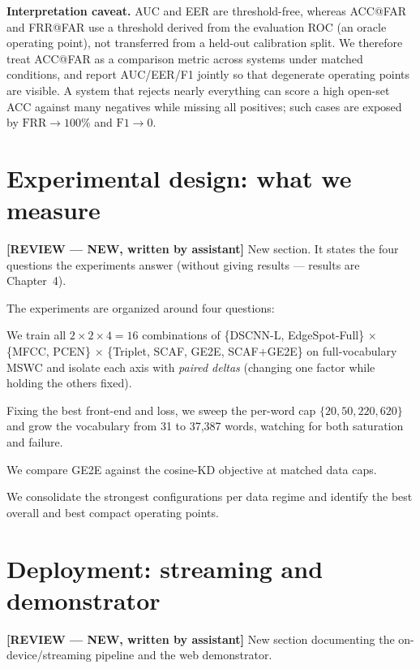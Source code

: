 \documentclass[12pt,a4paper]{report}
\newcommand{\reviewnote}[1]{%
    \par\smallskip\noindent
    \colorbox{yellow!35}{\parbox{0.97\linewidth}{\small\textbf{[REVIEW — NEW, written by assistant]}\; #1}}%
    \par\smallskip}
\newcommand{\reviewnote}[1]{}
\newcommand{\frr}{\text{FRR}}
\begin{document}
\textbf{Interpretation caveat.} AUC and EER are threshold-free, whereas ACC@FAR
and FRR@FAR use a threshold derived from the evaluation ROC (an oracle operating
point), not transferred from a held-out calibration split. We therefore treat
ACC@FAR as a comparison metric across systems under matched conditions, and report
AUC/EER/F1 jointly so that degenerate operating points are visible. A system that
rejects nearly everything can score a high open-set ACC against many negatives
while missing all positives; such cases are exposed by $\frr\to100\%$ and
$\text{F1}\to0$.

\section{Experimental design: what we measure}\label{sec:expdesign}
\reviewnote{New section. It states the four questions the experiments answer
(without giving results --- results are Chapter~4).}

The experiments are organized around four questions:
\begin{description}[leftmargin=1.6em,itemsep=2pt]
\item[\textbf{Q1 --- Which design axis matters?}] We train all
$2{\times}2{\times}4 = 16$ combinations of \{DSCNN-L, EdgeSpot-Full\} $\times$
\{MFCC, PCEN\} $\times$ \{Triplet, SCAF, GE2E, SCAF$+$GE2E\} on full-vocabulary
MSWC and isolate each axis with \emph{paired deltas} (changing one factor while
holding the others fixed).
\item[\textbf{Q2 --- How does performance scale?}] Fixing the best front-end and
loss, we sweep the per-word cap $\{20,50,220,620\}$ and grow the vocabulary from
31 to 37,387 words, watching for both saturation and failure.
\item[\textbf{Q3 --- Can distillation replace data?}] We compare GE2E against the
cosine-KD objective at matched data caps.
\item[\textbf{Q4 --- What is the best deployable system?}] We consolidate the
strongest configurations per data regime and identify the best overall and best
compact operating points.
\end{description}

\section{Deployment: streaming and demonstrator}\label{sec:deploy}
\reviewnote{New section documenting the on-device/streaming pipeline and the web
demonstrator.}
\end{document}

